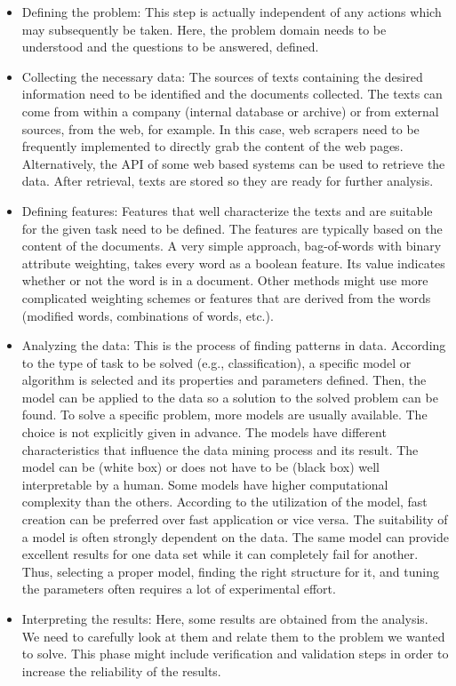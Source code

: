 \documentclass[10pt]{book}
\begin{document}
\begin{itemize}
  \item Defining the problem: This step is actually independent of any actions which may subsequently be taken. Here, the problem domain needs to be understood and the questions to be answered, defined.
  \item Collecting the necessary data: The sources of texts containing the desired information need to be identified and the documents collected. The texts can come from within a company (internal database or archive) or from external sources, from the web, for example. In this case, web scrapers need to be frequently implemented to directly grab the content of the web pages. Alternatively, the API of some web based systems can be used to retrieve the data. After retrieval, texts are stored so they are ready for further analysis.
  \item Defining features: Features that well characterize the texts and are suitable for the given task need to be defined. The features are typically based on the content of the documents. A very simple approach, bag-of-words with binary attribute weighting, takes every word as a boolean feature. Its value indicates whether or not the word is in a document. Other methods might use more complicated weighting schemes or features that are derived from the words (modified words, combinations of words, etc.).
  \item Analyzing the data: This is the process of finding patterns in data. According to the type of task to be solved (e.g., classification), a specific model or algorithm is selected and its properties and parameters defined. Then, the model can be applied to the data so a solution to the solved problem can be found. To solve a specific problem, more models are usually available. The choice is not explicitly given in advance. The models have different characteristics that influence the data mining process and its result. The model can be (white box) or does not have to be (black box) well interpretable by a human. Some models have higher computational complexity than the others. According to the utilization of the model, fast creation can be preferred over fast application or vice versa. The suitability of a model is often strongly dependent on the data. The same model can provide excellent results for one data set while it can completely fail for another. Thus, selecting a proper model, finding the right structure for it, and tuning the parameters often requires a lot of experimental effort.
  \item Interpreting the results: Here, some results are obtained from the analysis. We need to carefully look at them and relate them to the problem we wanted to solve. This phase might include verification and validation steps in order to increase the reliability of the results.
\end{itemize}
\end{document}
